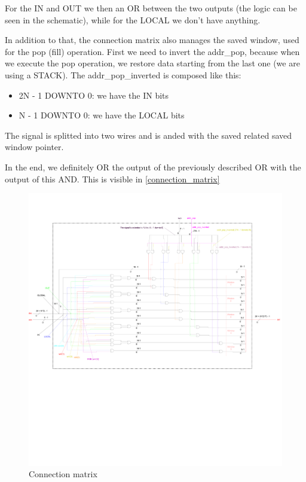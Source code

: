For the IN and OUT we then an OR between the two outputs (the logic can be seen in the schematic), while for the LOCAL we don't have anything.

In addition to that, the connection matrix also manages the saved window, used for the pop (fill) operation. First we need to invert the addr\_pop, because when we execute the pop operation, we restore data starting from the last one (we are using a STACK).
The addr\_pop\_inverted is composed like this:
\begin{itemize}
  \item 2N - 1 DOWNTO 0: we have the IN bits 
  \item N - 1 DOWNTO 0: we have the LOCAL bits
\end{itemize}

The signal is splitted into two wires and is anded with the saved related saved window pointer. 

In the end, we definitely OR the output of the previously described OR with the output of this AND. This is visible in \autoref{connection_matrix}

\begin{figure}[H]
  \centering
  \addtolength{\leftskip}{-3cm}
  \addtolength{\rightskip}{-3cm}
  \includegraphics[width=1.3\textwidth]{chapters/4_DecodeStage/images/connection_matrix.pdf}
  \caption{Connection matrix}
  \label{connection_matrix}
\end{figure}

